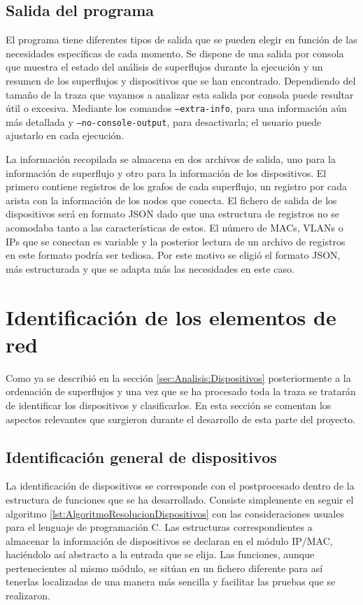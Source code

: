 \documentclass[twoside, 12pt]{epstfg}
\begin{document}
\subsection{Salida del programa}
El programa tiene diferentes tipos de salida que se pueden elegir en función de las necesidades específicas de cada momento. Se dispone de una salida por consola que muestra el estado del análisis de superflujos durante la ejecución y un resumen de los superflujos y dispositivos que se han encontrado. Dependiendo del tamaño de la traza que vayamos a analizar esta salida por consola puede resultar útil o excesiva. Mediante los comandos \texttt{--extra-info}, para una información aún más detallada y \texttt{--no-console-output}, para desactivarla; el usuario puede ajustarlo en cada ejecución.

La información recopilada se almacena en dos archivos de salida, uno para la información de superflujo y otro para la información de los dispositivos. El primero contiene registros de los grafos de cada superflujo, un registro por cada arista con la información de los nodos que conecta. El fichero de salida de los dispositivos será en formato JSON dado que una estructura de registros no se acomodaba tanto a las características de estos. El número de MACs, VLANs o IPs que se conectan es variable y la posterior lectura de un archivo de registros en este formato podría ser tediosa. Por este motivo se eligió el formato JSON, más estructurada y que se adapta más las necesidades en este caso.

\section{Identificación de los elementos de red}
Como ya se describió en la sección \ref{sec:Analisis:Dispositivos} posteriormente a la ordenación de superflujos y una vez que se ha procesado toda la traza se tratarán de identificar los dispositivos y clasificarlos. En esta sección se comentan los aspectos relevantes que surgieron durante el desarrollo de esta parte del proyecto.

\subsection{Identificación general de dispositivos}
La identificación de dispositivos se corresponde con el postprocesado dentro de la estructura de funciones que se ha desarrollado. Consiste simplemente en seguir el algoritmo \ref{lst:AlgoritmoResolucionDispositivos} con las consideraciones usuales para el lenguaje de programación C. Las estructuras correspondientes a almacenar la información de dispositivos se declaran en el módulo IP/MAC, haciéndolo así abstracto a la entrada que se elija. Las funciones, aunque pertenecientes al mismo módulo, se sitúan en un fichero diferente para así tenerlas localizadas de una manera más sencilla y facilitar las pruebas que se realizaron.
\end{document}
